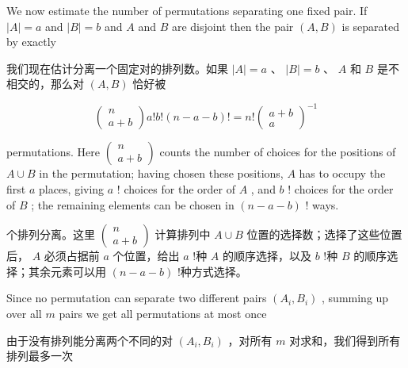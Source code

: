 \documentclass[10pt]{article}
\begin{document}
We now estimate the number of permutations separating one fixed pair. If \(\left| A\right|  = a\) and \(\left| B\right|  = b\) and \(A\) and \(B\) are disjoint then the pair \(\left( {A,B}\right)\) is separated by exactly

\begin{tcolorbox}\relax
我们现在估计分离一个固定对的排列数。如果 \(\left| A\right|  = a\) 、 \(\left| B\right|  = b\) 、 \(A\) 和 \(B\) 是不相交的，那么对 \(\left( {A,B}\right)\) 恰好被
\end{tcolorbox}

\[
\left( \begin{matrix} n \\  a + b \end{matrix}\right) a!b!\left( {n - a - b}\right) ! = n!{\left( \begin{matrix} a + b \\  a \end{matrix}\right) }^{-1}
\]

permutations. Here \(\left( \begin{matrix} n \\  a + b \end{matrix}\right)\) counts the number of choices for the positions of \(A \cup  B\) in the permutation; having chosen these positions, \(A\) has to occupy the first \(a\) places, giving \(a\) ! choices for the order of \(A\) , and \(b\) ! choices for the order of \(B\) ; the remaining elements can be chosen in \(\left( {n - a - b}\right)\) ! ways.

\begin{tcolorbox}\relax
个排列分离。这里 \(\left( \begin{matrix} n \\  a + b \end{matrix}\right)\) 计算排列中 \(A \cup  B\) 位置的选择数；选择了这些位置后， \(A\) 必须占据前 \(a\) 个位置，给出 \(a\) !种 \(A\) 的顺序选择，以及 \(b\) !种 \(B\) 的顺序选择；其余元素可以用 \(\left( {n - a - b}\right)\) !种方式选择。
\end{tcolorbox}

Since no permutation can separate two different pairs \(\left( {{A}_{i},{B}_{i}}\right)\) , summing up over all \(m\) pairs we get all permutations at most once

\begin{tcolorbox}\relax
由于没有排列能分离两个不同的对 \(\left( {{A}_{i},{B}_{i}}\right)\) ，对所有 \(m\) 对求和，我们得到所有排列最多一次
\end{tcolorbox}
\end{document}
